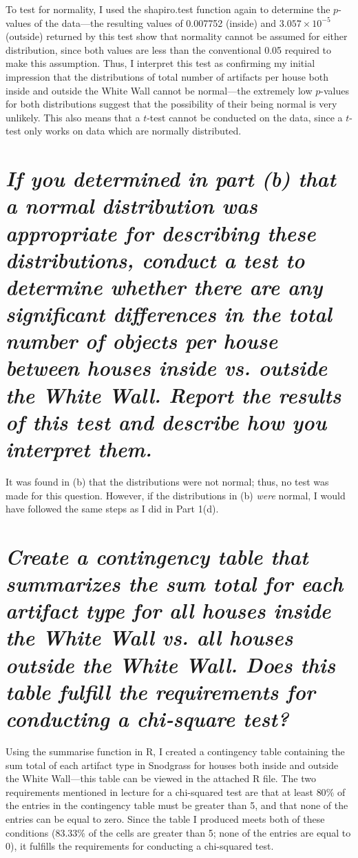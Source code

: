 \documentclass[answers]{exam}
\begin{document}
\begin{parts}
\quad\quad To test for normality, I used the shapiro.test function again to determine the $p$-values of the data---the resulting values of 0.007752 (inside) and $3.057\times10^{-5}$ (outside) returned by this test show that normality cannot be assumed for either distribution, since both values are less than the conventional 0.05 required to make this assumption. Thus, I interpret this test as confirming my initial impression that the distributions of total number of artifacts per house both inside and outside the White Wall cannot be  normal---the extremely low $p$-values for both distributions suggest that the possibility of their being normal is very unlikely. This also means that a $t$-test cannot be conducted on the data, since a $t$-test only works on data which are normally distributed.\color{black}
\part{\textit{If you determined in part (b) that a normal distribution \textbf{was} appropriate for describing these distributions, conduct a test to determine whether there are any significant differences in the total number of objects per house between houses inside vs. outside the White Wall. Report the results of this test and describe how you interpret them.}}\color{nr}

\quad\quad It was found in (b) that the distributions were not normal; thus, no test was made for this question. However, if the distributions in (b) \textit{were} normal, I would have followed the same steps as I did in Part 1(d).\color{black}
\part{\textit{Create a contingency table that summarizes the sum total for each artifact type for all houses inside the White Wall vs. all houses outside the White Wall. Does this table fulfill the requirements for conducting a chi‐square test?}}\color{nr}

\quad\quad Using the summarise function in R, I created a contingency table containing the sum total of each artifact type in Snodgrass for houses both inside and outside the White Wall---this table can be viewed in the attached R file. The two requirements mentioned in lecture for a chi-squared test are that at least $80\%$ of the entries in the contingency table must be greater than 5, and that none of the entries can be equal to zero. Since the table I produced meets both of these conditions (83.33\% of the cells are greater than 5; none of the entries are equal to 0), it fulfills the requirements for conducting a chi-squared test.\color{black}

\end{parts}
\end{document}
